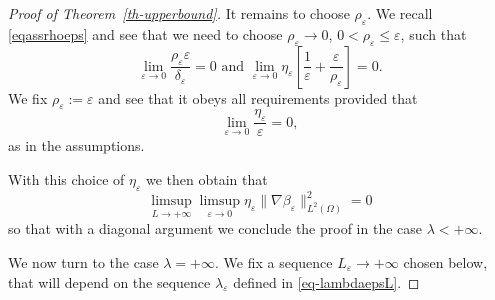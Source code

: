 \documentclass[a4paper,reqno]{amsart}
\newcommand\eps{{\varepsilon}}
\theoremstyle{remark}
\numberwithin{equation}{section}
\begin{document}
\begin{proof}[Proof of Theorem~\ref{th-upperbound}]
	It remains to choose $\rho_\eps$.
	We recall \eqref{eqassrhoeps} and see that we need to choose $\rho_\eps\to0$, $0<\rho_\eps\le\eps$, such that
	\begin{equation}\label{eqconditionsrhoeps}
		\lim_{\eps\to0}\frac{\rho_\eps \eps}{\delta_\eps}=0
		\text{ and }
		\lim_{\eps\to0}\eta_\eps \left[ \frac1\eps+\frac{ \eps}{\rho_\eps}\right]=0.
	\end{equation}
	We fix $\rho_\eps:=\eps$ and see that it obeys all requirements provided that
	\begin{equation}\label{eq-choiceeta}
		\lim_{\eps\to0}  \frac{\eta_\eps }\eps=0,
\end{equation}
as in the assumptions.

With this choice of $\eta_\eps$ we then obtain that
	\begin{equation}\label{eqL2estimateeta}
\limsup_{L\to +\infty}\limsup_{\eps\to 0}\eta_\eps	\|\nabla\beta_\eps\|_{L^2(\Omega)}^2=0
\end{equation}
so that with a diagonal argument we conclude the proof in the case $\lambda<+\infty$.

We now turn to the case $\lambda=+\infty$.  We fix a sequence $L_\eps\to +\infty$ chosen below, that will depend on the sequence $\lambda_\eps$ defined in \eqref{eq-lambdaepsL}.


\end{proof}
\end{document}
